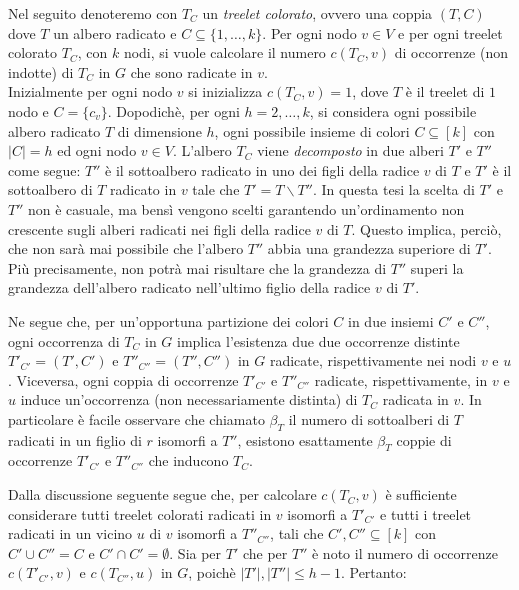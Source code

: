 Nel seguito denoteremo con $ T_C $ un \emph{treelet colorato}, ovvero una coppia $ (T,C) $ dove $ T $ un albero radicato e $ C \subseteq \{1,\dots,k\}$.
Per ogni nodo $ v \in V $ e per ogni treelet colorato $ T_C $, con $ k $ nodi, si vuole calcolare il numero $ c(T_C , v) $ di occorrenze (non indotte) di $ T_C $  in $ G $ che sono radicate in $v$.\\
Inizialmente per ogni nodo $ v $ si inizializza $ c(T_C , v) = 1 $, dove $T$ \`e il treelet di $1$ nodo e $ C = \{c_v\}$.
Dopodichè, per ogni $ h = 2,\dots,k $,  si considera ogni possibile albero radicato $T$ di dimensione $ h $, ogni possibile insieme di colori $ C \subseteq [k] $ con $ |C| = h $ ed ogni nodo $v \in V$.
L'albero $T_C$ viene \emph{decomposto} in due alberi $T'$ e $T''$ come segue: $ T'' $ \`e il sottoalbero radicato in uno dei figli della radice $ v $ di $ T $ e $ T' $ \`e il sottoalbero di $ T $ radicato in $ v $ tale che $ T' = T \backslash T'' $. In questa tesi la scelta di $ T' $ e $ T'' $ non è casuale, ma bensì vengono scelti garantendo un'ordinamento non crescente sugli alberi radicati nei figli della radice $ v $ di $ T $.
Questo implica, perciò, che non sar\`a mai possibile che l'albero $ T'' $ abbia una grandezza superiore di $ T' $.
Più precisamente, non potrà mai risultare che la grandezza di $ T'' $ superi la grandezza dell'albero radicato nell'ultimo figlio della radice $ v $ di $ T' $.

Ne segue che, per un'opportuna partizione dei colori $C$ in due insiemi $C'$ e $C''$, ogni occorrenza di $T_C$ in $G$ implica l'esistenza due due occorrenze distinte $T'_{C'} = (T', C')$ e $T''_{C''} = (T'', C'')$  in $G$ radicate, rispettivamente nei nodi $v$ e $u$.
Viceversa, ogni coppia di occorrenze $T'_{C'}$ e $T''_{C''}$ radicate, rispettivamente, in $v$ e $u$ induce un'occorrenza (non necessariamente distinta) di $T_C$ radicata in $v$.
In particolare è facile osservare che chiamato $\beta_T$ il numero di sottoalberi di $T$ radicati in un figlio di $r$ isomorfi a $T''$, esistono esattamente $\beta_T$ coppie di occorrenze $T'_{C'}$ e $T''_{C''}$ che inducono $T_C$. 

Dalla discussione seguente segue che, per calcolare $ c(T_C,v)$ è sufficiente considerare tutti treelet colorati radicati in $ v $ isomorfi a $ T'_{C'} $ e tutti i  treelet radicati in un vicino $ u $ di $v$ isomorfi a $ T''_{C''} $, tali che $ C',C'' \subseteq [k] $ con  $C' \cup C'' = C$ e $C' \cap C' = \emptyset$. 
Sia per $ T' $ che per $ T'' $ \`e noto il numero di occorrenze $ c(T'_{C'},v) $ e $ c(T_{C''},u) $ in $ G $, poich\`e $|T'|, |T''| \le h-1$. Pertanto:

